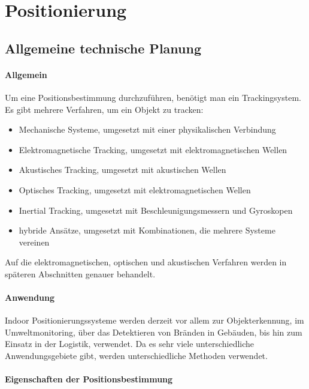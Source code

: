 \chapter{Positionierung}
\renewcommand{\kapitelautor}{Autor: Christina Bornberg, Lucas Ullrich}

\section{Allgemeine technische Planung}

    \subsubsection{Allgemein}
    Um eine Positionsbestimmung durchzuführen, benötigt man ein Trackingsystem. 
    Es gibt mehrere Verfahren, um ein Objekt zu tracken: \cite{PositionAllg}
    \begin{itemize}
    \item Mechanische Systeme, umgesetzt mit einer physikalischen Verbindung
    \item Elektromagnetische Tracking, umgesetzt mit elektromagnetischen Wellen
    \item Akustisches Tracking, umgesetzt mit akustischen Wellen
    \item Optisches Tracking, umgesetzt mit elektromagnetischen Wellen
    \item Inertial Tracking, umgesetzt mit Beschleunigungsmessern und Gyroskopen
    \item hybride Ansätze, umgesetzt mit Kombinationen, die mehrere Systeme vereinen
    \end{itemize}   
    Auf die elektromagnetischen, optischen und akustischen Verfahren werden in späteren Abschnitten genauer behandelt.

    \subsubsection{Anwendung} 
    Indoor Positionierungssysteme werden derzeit vor allem zur Objekterkennung, im Umweltmonitoring, über das Detektieren von Bränden in Gebäuden, bis hin zum Einsatz in der Logistik, verwendet. Da es sehr viele unterschiedliche Anwendungsgebiete gibt, werden unterschiedliche Methoden verwendet. \cite{posAnwendung}

    \subsubsection{Eigenschaften der Positionsbestimmung}

